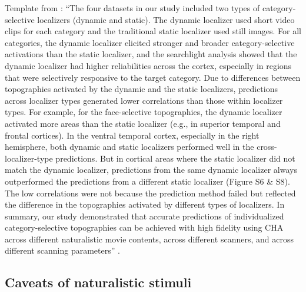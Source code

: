 Template from \citet{jiahui2022cross}:
%
``The four datasets in our study included two types of category-selective
localizers (dynamic and static).
%
The dynamic localizer used short video clips for each category and the
traditional static localizer used still images.
%
For all categories, the dynamic localizer elicited stronger and broader
category-selective activations than the static localizer, and the searchlight
analysis showed that the dynamic localizer had higher reliabilities across the
cortex, especially in regions that were selectively responsive to the target
category.
%
Due to differences between topographies activated by the dynamic and the static
localizers, predictions across localizer types generated lower correlations than
those within localizer types.
%
For example, for the face-selective topographies, the dynamic localizer
activated more areas than the static localizer (e.g., in superior temporal and
frontal cortices).
%
In the ventral temporal cortex, especially in the right hemisphere, both dynamic
and static localizers performed well in the cross-localizer-type predictions.
%
But in cortical areas where the static localizer did not match the dynamic
localizer, predictions from the same dynamic localizer always outperformed the
predictions from a different static localizer (Figure S6 \& S8).
%
The low correlations were not because the prediction method failed but reflected
the difference in the topographies activated by different types of localizers.
%
In summary, our study demonstrated that accurate predictions of individualized
category-selective topographies can be achieved with high fidelity using CHA
across different naturalistic movie contents, across different scanners, and
across different scanning parameters'' \citep{jiahui2022cross}.


\subsection{Caveats of naturalistic stimuli}




